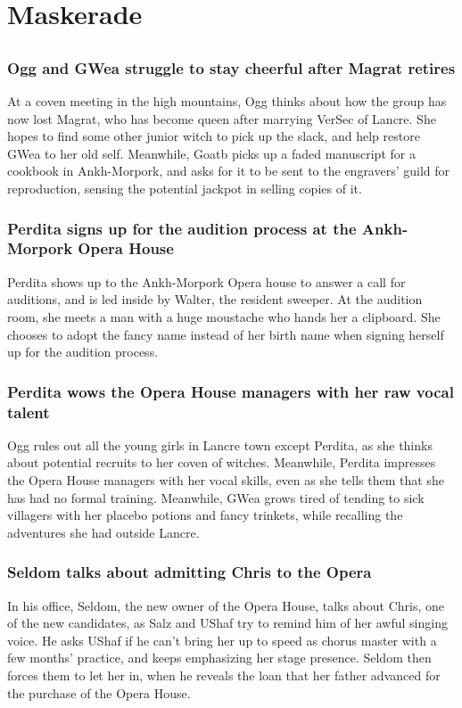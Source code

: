 \section{Maskerade}


\subsection{}
\subsubsection{\Gls{Ogg} and \Gls{GWea} struggle to stay cheerful after \Gls{Magrat} retires}
At a coven meeting in the high mountains, \Gls{Ogg} thinks about how the group has now lost
\Gls{Magrat}, who has become queen after marrying \Gls{VerSec} of Lancre. She hopes to find some
other junior witch to pick up the slack, and help restore \Gls{GWea} to her old self. Meanwhile,
\Gls{Goatb} picks up a faded manuscript for a cookbook in Ankh-Morpork, and asks for it to be
sent to the engravers' guild for reproduction, sensing the potential jackpot in selling copies of
it.

\subsubsection{\Gls{Perdita} signs up for the audition process at the Ankh-Morpork Opera House}
\Gls{Perdita} shows up to the Ankh-Morpork Opera house to answer a call for auditions, and is led
inside by \Gls{Walter}, the resident sweeper. At the audition room, she meets a man with a huge
moustache who hands her a clipboard. She chooses to adopt the fancy name instead of her birth
name when signing herself up for the audition process.

\subsubsection{\Gls{Perdita} wows the Opera House managers with her raw vocal talent}
\Gls{Ogg} rules out all the young girls in Lancre town except \Gls{Perdita}, as she thinks about
potential recruits to her coven of witches. Meanwhile, \Gls{Perdita} impresses the Opera House
managers with her vocal skills, even as she tells them that she has had no formal training.
Meanwhile, \Gls{GWea} grows tired of tending to sick villagers with her placebo potions and fancy
trinkets, while recalling the adventures she had outside Lancre.

\subsubsection{\Gls{Seldom} talks about admitting \Gls{Chris} to the Opera}
In his office, \Gls{Seldom}, the new owner of the Opera House, talks about \Gls{Chris}, one of the
new candidates, as \Gls{Salz} and \Gls{UShaf} try to remind him of her awful singing voice. He
asks \Gls{UShaf} if he can't bring her up to speed as chorus master with a few months' practice, and
keeps emphasizing her stage presence. \Gls{Seldom} then forces them to let her in, when he reveals
the loan that her father advanced for the purchase of the Opera House.

